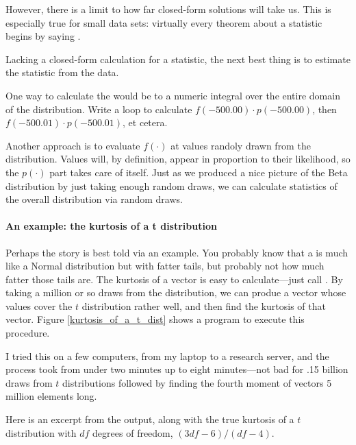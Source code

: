 However, there is a limit to how far closed-form solutions will take us.
This is especially true for small data sets: virtually every theorem
about a statistic begins by saying .

Lacking a closed-form calculation for a statistic, the next best thing
is to estimate the statistic from the data. 

One way to calculate the  would be to a numeric integral
over the entire domain of the distribution. Write a loop to 
calculate $f(-500.00)\cdot p(-500.00)$, then
$f(-500.01)\cdot p(-500.01)$, et cetera. 

Another approach is to evaluate $f(\cdot)$ at values randoly drawn from
the distribution. Values will, by definition, appear in proportion to
their likelihood, so the $p(\cdot)$ part takes care of itself. Just as
we produced a nice picture of the Beta distribution by just taking
enough random draws, we can calculate statistics of the overall
distribution via random draws.

\paragraph{An example: the kurtosis of a t distribution} Perhaps the
story is best told via an example.  You probably
know that a  is much like a Normal distribution but
with fatter tails, but probably not how much fatter those tails are.
The kurtosis of a vector is easy to calculate---just call
. By taking a million or so draws from the
distribution, we can produe a vector whose values cover the $t$
distribution rather well, and then find the kurtosis of that vector.
Figure \ref{kurtosis_of_a_t_dist} shows a program to execute this procedure. 

I tried this on a few computers, from my laptop to a research
server, and the process took from under two minutes up to eight
minutes---not bad for .15 billion draws from $t$ distributions followed
by finding the fourth moment of vectors 5 million elements long.

Here is an excerpt from the output, along with the true
kurtosis of a $t$ distribution with $df$ degrees of freedom, $(3 df - 6)/(df - 4)$.


